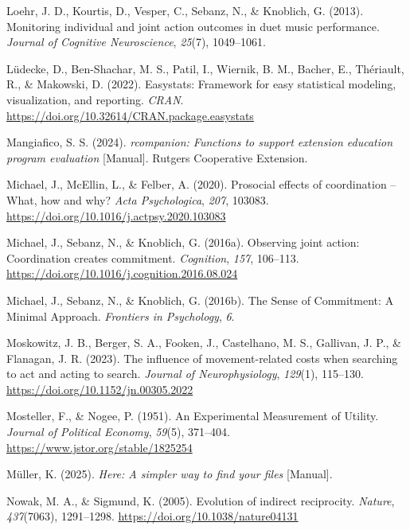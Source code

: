 \documentclass[
  11pt,
  letterpaper,
]{article}
\newlength{\cslhangindent}
\newenvironment{CSLReferences}[2] %
 {\begin{list}{}{%
  \setlength{\itemindent}{0pt}
  \setlength{\leftmargin}{0pt}
  \setlength{\parsep}{0pt}
  \ifodd #1
   \setlength{\leftmargin}{\cslhangindent}
   \setlength{\itemindent}{-1\cslhangindent}
  \fi
  \setlength{\itemsep}{#2\baselineskip}}}
 {\end{list}}
\renewcommand{\emph}[1]{\textit{#1}}  %
\begin{document}
\begin{CSLReferences}{1}{0}
Loehr, J. D., Kourtis, D., Vesper, C., Sebanz, N., \& Knoblich, G.
(2013). Monitoring individual and joint action outcomes in duet music
performance. \emph{Journal of Cognitive Neuroscience}, \emph{25}(7),
1049--1061.

Lüdecke, D., Ben-Shachar, M. S., Patil, I., Wiernik, B. M., Bacher, E.,
Thériault, R., \& Makowski, D. (2022). Easystats: {Framework} for easy
statistical modeling, visualization, and reporting. \emph{CRAN}.
\url{https://doi.org/10.32614/CRAN.package.easystats}

Mangiafico, S. S. (2024). \emph{{rcompanion}: {Functions} to support
extension education program evaluation} {[}Manual{]}. Rutgers
Cooperative Extension.

Michael, J., McEllin, L., \& Felber, A. (2020). Prosocial effects of
coordination -- {What}, how and why? \emph{Acta Psychologica},
\emph{207}, 103083. \url{https://doi.org/10.1016/j.actpsy.2020.103083}

Michael, J., Sebanz, N., \& Knoblich, G. (2016a). Observing joint
action: {Coordination} creates commitment. \emph{Cognition}, \emph{157},
106--113. \url{https://doi.org/10.1016/j.cognition.2016.08.024}

Michael, J., Sebanz, N., \& Knoblich, G. (2016b). The {Sense} of
{Commitment}: {A Minimal Approach}. \emph{Frontiers in Psychology},
\emph{6}.

Moskowitz, J. B., Berger, S. A., Fooken, J., Castelhano, M. S.,
Gallivan, J. P., \& Flanagan, J. R. (2023). The influence of
movement-related costs when searching to act and acting to search.
\emph{Journal of Neurophysiology}, \emph{129}(1), 115--130.
\url{https://doi.org/10.1152/jn.00305.2022}

Mosteller, F., \& Nogee, P. (1951). An {Experimental Measurement} of
{Utility}. \emph{Journal of Political Economy}, \emph{59}(5), 371--404.
\url{https://www.jstor.org/stable/1825254}

Müller, K. (2025). \emph{Here: A simpler way to find your files}
{[}Manual{]}.

Nowak, M. A., \& Sigmund, K. (2005). Evolution of indirect reciprocity.
\emph{Nature}, \emph{437}(7063), 1291--1298.
\url{https://doi.org/10.1038/nature04131}


\end{CSLReferences}
\end{document}
